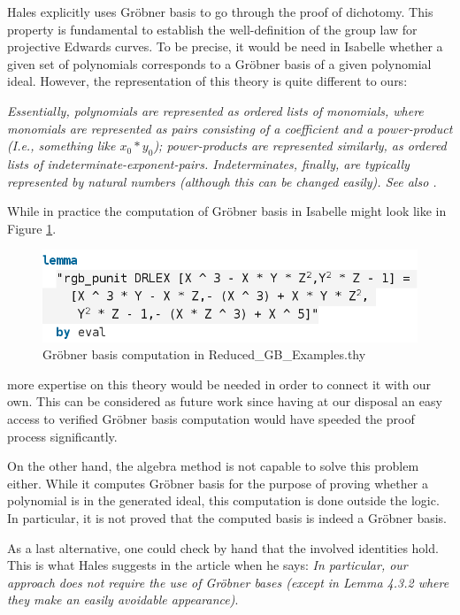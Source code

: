 Hales explicitly uses Gröbner basis to go through the proof of dichotomy. This property is fundamental to establish the well-definition of the group law for projective Edwards curves. To be precise, it would be need in Isabelle whether a given set of polynomials corresponds to a Gröbner basis of a given polynomial ideal. However, the representation of this theory is quite different to ours:

\textit{Essentially, polynomials are represented as ordered lists of monomials, where monomials are represented as pairs consisting of a coefficient and a power-product (I.e., something like $x_0*y_0$); power-products are represented similarly, as ordered lists of indeterminate-exponent-pairs. Indeterminates, finally, are typically represented by natural numbers (although this can be changed easily). See also \cite{maletzky2018grobner}.}

While in practice the computation of Gröbner basis in Isabelle might look like in Figure \ref{fig:groebner}.

\begin{figure}[!htbp]
	\centering
	\includegraphics[width=0.8\linewidth,height=0.8\textheight,keepaspectratio]{img/groebner.png}
    \caption{Gröbner basis computation in Reduced\_GB\_Examples.thy}
    \label{fig:groebner}
\end{figure}

more expertise on this theory would be needed in order to connect it with our own. This can be considered as future work since having at our disposal an easy access to verified Gröbner basis computation would have speeded the proof process significantly. 

On the other hand, the algebra method is not capable to solve this problem either. While it computes Gröbner basis for the purpose of proving whether a polynomial is in the generated ideal, this computation is done outside the logic. In particular, it is not proved that the computed basis is indeed a Gröbner basis. 

As a last alternative, one could check by hand that the involved identities hold. This is what Hales suggests in the article when he says: \textit{In particular, our approach does not require the use of Gröbner bases (except in Lemma 4.3.2 where they make an easily avoidable appearance)}. 

